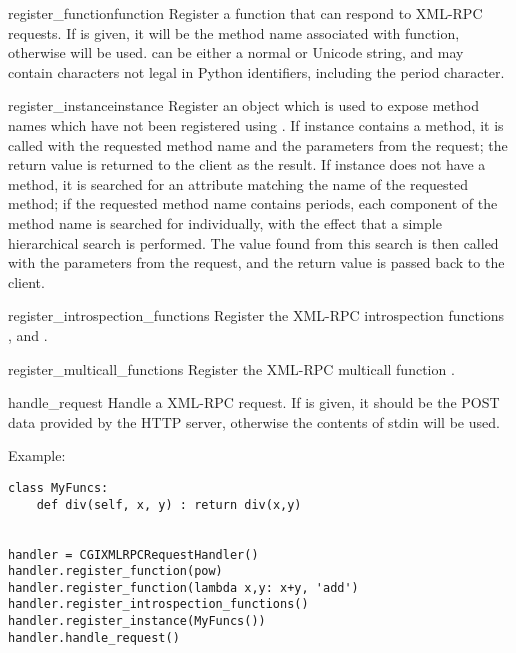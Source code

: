 \begin{methoddesc}{register_function}{function}
Register a function that can respond to XML-RPC requests. If 
 is given, it will be the method name associated with 
function, otherwise  will be used. 
can be either a normal or Unicode string, and may contain 
characters not legal in Python identifiers, including the period
character. 
\end{methoddesc}

\begin{methoddesc}{register_instance}{instance}
Register an object which is used to expose method names 
which have not been registered using . If 
instance contains a  method, it is called with the 
requested method name and the parameters from the 
request; the return value is returned to the client as the result.
If instance does not have a  method, it is searched 
for an attribute matching the name of the requested method; if 
the requested method name contains periods, each 
component of the method name is searched for individually, 
with the effect that a simple hierarchical search is performed. 
The value found from this search is then called with the 
parameters from the request, and the return value is passed 
back to the client. 
\end{methoddesc}

\begin{methoddesc}{register_introspection_functions}{}
Register the XML-RPC introspection functions 
,  and 
.
\end{methoddesc}

\begin{methoddesc}{register_multicall_functions}{}
Register the XML-RPC multicall function .
\end{methoddesc}

\begin{methoddesc}{handle_request}{}
Handle a XML-RPC request. If  is given, it 
should be the POST data provided by the HTTP server, 
otherwise the contents of stdin will be used.
\end{methoddesc}

Example:

\begin{verbatim}
class MyFuncs:
    def div(self, x, y) : return div(x,y)


handler = CGIXMLRPCRequestHandler()
handler.register_function(pow)
handler.register_function(lambda x,y: x+y, 'add')
handler.register_introspection_functions()
handler.register_instance(MyFuncs())
handler.handle_request()
\end{verbatim}
